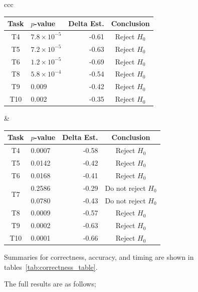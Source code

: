 \begin{table}[htpb]
\begin{tabular}{ccc}
    \begin{tabular}{clrc}
      \toprule
      Task & $p$-value            & Delta Est. & Conclusion\\\midrule
      T4   & $7.8 \times 10^{-5}$ & -0.61      & Reject $H_0$\\
      T5   & $7.2 \times 10^{-5}$ & -0.63      & Reject $H_0$\\
      T6   & $1.2 \times 10^{-5}$ & -0.69      & Reject $H_0$\\
      T8   & $5.8 \times 10^{-4}$ & -0.54      & Reject $H_0$\\
      T9   & $0.009$              & -0.42      & Reject $H_0$\\
      T10  & $0.002$              & -0.35      & Reject $H_0$\\
      \bottomrule
    \end{tabular}
    &
    \begin{tabular}{clrc}
      \toprule
      Task                 & $p$-value & Delta Est. & Conclusion\\\midrule
      T4                   & 0.0007    & -0.58      & Reject $H_0$\\
      T5                   & 0.0142    & -0.42      & Reject $H_0$\\
      T6                   & 0.0168    & -0.41      & Reject $H_0$\\
      \multirow{2}{*}{T7}  & 0.2586    & -0.29      & Do not reject $H_0$\\
                           & 0.0780    & -0.43      & Do not reject $H_0$\\
      T8                   & 0.0009    & -0.57      & Reject $H_0$\\
      T9                   & 0.0002    & -0.63      & Reject $H_0$\\
      T10                  & 0.0001    & -0.66      & Reject $H_0$\\
      \bottomrule
    \end{tabular}
  \end{tabular}
\end{table}

Summaries for correctness, accuracy, and timing are shown in
tables~\ref{tab:correctness_table}.


The full results are as follows;

